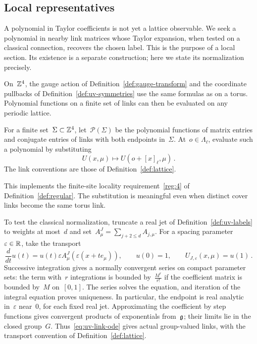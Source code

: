 \subsection{Local representatives}

A polynomial in Taylor coefficients is not yet a lattice observable.
We seek a polynomial in nearby link matrices whose Taylor expansion, when tested on a classical connection, recovers the chosen label.
This is the purpose of a local section.
Its existence is a separate construction; here we state its normalization precisely.

On~$\mathbb Z^4$, the gauge action of Definition~\ref{def:gauge-transform} and the coordinate pullbacks of Definition~\ref{def:uv-symmetries} use the same formulas as on a torus.
Polynomial functions on a finite set of links can then be evaluated on any periodic lattice.

\begin{definition}\label{def:uv-polynomials}
For a finite set~$\Sigma\subset\mathbb Z^4$, let~$\mathcal P(\Sigma)$ be the polynomial functions of matrix entries and conjugate entries of links with both endpoints in~$\Sigma$.
At~$o\in\Lambda_\ell$, evaluate such a polynomial by substituting
\begin{equation}\label{eq:uv-placement}
 U(x,\mu)\longmapsto U(o+[x]_\ell,\mu)\,.
\end{equation}
The link conventions are those of Definition~\ref{def:lattice}.
\end{definition}

This implements the finite-site locality requirement~\ref{reg:4} of Definition~\ref{def:regular}.
The substitution is meaningful even when distinct cover links become the same torus link.

To test the classical normalization, truncate a real jet of Definition~\ref{def:uv-labels} to weights at most~$d$ and set~$A^J_\mu=\sum_{j+2\le d}A_{j,\mu}$.
For a spacing parameter~$\varepsilon\in\mathbb R$, take the transport
\begin{equation}\label{eq:uv-link-ode}
 \frac{d}{dt}u(t)=u(t)\varepsilon A_\mu^J(\varepsilon(x+te_\mu)),\qquad
 u(0)=1,\qquad U_{J,\varepsilon}(x,\mu)=u(1)\,.
\end{equation}
Successive integration gives a normally convergent series on compact parameter sets: the term with~$r$ integrations is bounded by~$\frac{M^r}{r!}$ if the coefficient matrix is bounded by~$M$ on~$[0,1]$.
The series solves the equation, and iteration of the integral equation proves uniqueness.
In particular, the endpoint is real analytic in~$\varepsilon$ near~$0$, for each fixed real jet.
Approximating the coefficient by step functions gives convergent products of exponentials from~$\mathfrak g$; their limits lie in the closed group~$G$.
Thus~\eqref{eq:uv-link-ode} gives actual group-valued links, with the transport convention of Definition~\ref{def:lattice}.

